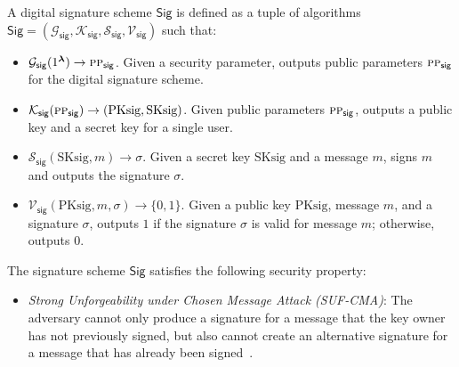 \begin{definition}
	\label{def:Strongly-unforgeable digital signature}
	
	A digital signature scheme $\mathsf{Sig}$ is defined as a tuple of algorithms $\mathsf{Sig}=(\mathcal{G}_\mathsf{sig}, \mathcal{K}_\mathsf{sig}, \mathcal{S}_\mathsf{sig}, \mathcal{V}_\mathsf{sig})$ such that:
	\begin{itemize}
		\item $\mathcal{G}_\mathsf{sig}(1^{\boldsymbol{\lambda}}) \rightarrow \textsc{pp}_\mathsf{sig}$. Given a security parameter, outputs public parameters $\textsc{pp}_\mathsf{sig}$ for the digital signature scheme.
		\item $\mathcal{K}_\mathsf{sig}(\textsc{pp}_\mathsf{sig}) \rightarrow (\text{PKsig}, \text{SKsig})$. Given public parameters $\textsc{pp}_\mathsf{sig}$, outputs a public key and a secret key for a single user.
		\item $\mathcal{S}_\mathsf{sig}(\text{SKsig}, m) \rightarrow \sigma$. Given a secret key $\text{SKsig}$ and a message $m$, signs $m$ and outputs the signature $\sigma$.
		\item $\mathcal{V}_\mathsf{sig}(\text{PKsig}, m, \sigma) \rightarrow \{0, 1\}$. Given a public key $\text{PKsig}$, message $m$, and a signature $\sigma$, outputs $1$ if the signature $\sigma$ is valid for message $m$; otherwise, outputs $0$.
	\end{itemize}
	The signature scheme $\mathsf{Sig}$ satisfies the following security property:
	\begin{itemize}
		\item \textit{Strong Unforgeability under Chosen Message Attack (SUF-CMA)}: The adversary cannot only produce a signature for a message that the key owner has not previously signed, but also cannot create an alternative signature for a message that has already been signed~\cite{Brendel2021TheProvableSecurity}.
	\end{itemize}
\end{definition}


	
